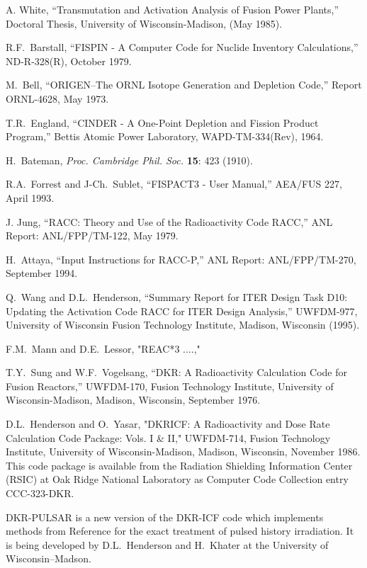\begin{thebibliography}{100}

 A. White, ``Transmutation and Activation
  Analysis of Fusion Power Plants,'' Doctoral Thesis, University of
  Wisconsin-Madison, (May 1985).
  
 R.F.~Barstall, ``FISPIN - A Computer Code for
  Nuclide Inventory Calculations,'' ND-R-328(R), October 1979.

 M.~Bell, ``ORIGEN--The ORNL Isotope Generation
  and Depletion Code,'' Report ORNL-4628, May 1973.
  
 T.R.~England, ``CINDER - A One-Point Depletion and
  Fission Product Program,'' Bettis Atomic Power Laboratory,
  WAPD-TM-334(Rev), 1964.
  
 H.~Bateman, \textsl{Proc. Cambridge Phil. Soc.}
  \textbf{15}: 423 (1910).
  
 R.A.~Forrest and J-Ch.~Sublet, ``FISPACT3 - User
  Manual,'' AEA/FUS 227, April 1993.
  
 J. Jung, ``RACC: Theory and Use of the
  Radioactivity Code RACC,'' ANL Report: ANL/FPP/TM-122, May 1979.
  
 H.~Attaya, ``Input Instructions for RACC-P,'' ANL
  Report: ANL/FPP/TM-270, September 1994.
  
 Q.~Wang and D.L.~Henderson, ``Summary Report for ITER
  Design Task D10: Updating the Activation Code RACC for ITER Design
  Analysis,'' UWFDM-977, University of Wisconsin Fusion Technology
  Institute, Madison, Wisconsin (1995).

F.M.~Mann and D.E.~Lessor, "REAC*3 ....," 

T.Y.~Sung and W.F.~Vogelsang, ``DKR: A Radioactivity
  Calculation Code for Fusion Reactors,'' UWFDM-170, Fusion Technology
  Institute, University of Wisconsin-Madison, Madison, Wisconsin,
  September 1976.
  
D.L.~Henderson and O.~Yasar, "DKRICF: A Radioactivity
  and Dose Rate Calculation Code Package: Vols. I \& II," UWFDM-714,
  Fusion Technology Institute, University of Wisconsin-Madison,
  Madison, Wisconsin, November 1986.  This code package is available
  from the Radiation Shielding Information Center (RSIC) at Oak Ridge
  National Laboratory as Computer Code Collection entry CCC-323-DKR.
  
 DKR-PULSAR is a new version of the DKR-ICF code
  which implements methods from Reference \cite{PULSAR} for the
  exact treatment of pulsed history irradiation.  It is being
  developed by D.L.~Henderson and H.~Khater at the University of
  Wisconsin--Madson.
  

\end{thebibliography}
